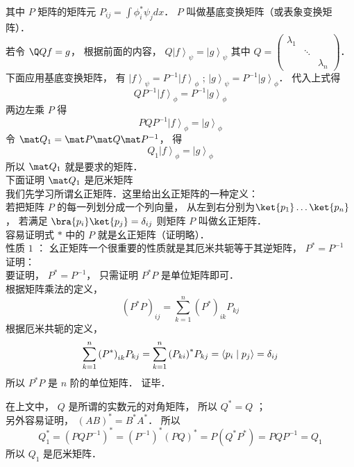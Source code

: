 其中 $P$ 矩阵的矩阵元 ${P_{ij}} = \int {\phi _i^*{\psi _j}dx} $．  $P$ 叫做基底变换矩阵（或表象变换矩阵）．\\
若令 $\Q Q f = g$，  根据前面的内容， $Q{\left| f \right\rangle _\psi } = {\left| g \right\rangle _\psi }$ 其中 $Q = \left( {\begin{aligned}
{{\lambda _1}}&{}&{}\\
{}& \ddots &{}\\
{}&{}&{{\lambda _n}}
\end{aligned}} \right)$． \\
下面应用基底变换矩阵， 有 ${\left| f \right\rangle _\psi } = {P^{ - 1}}{\left| f \right\rangle _\phi }$ ; ${\left| g \right\rangle _\psi } = {P^{ - 1}}{\left| g \right\rangle _\phi }$． 代入上式得
\begin{equation}
  Q{P^{ - 1}}{\left| f \right\rangle _\phi } = {P^{ - 1}}{\left| g \right\rangle _\phi }
\end{equation}
两边左乘 $P$ 得
\begin{equation}
  PQ{P^{ - 1}}{\left| f \right\rangle _\phi } = {\left| g \right\rangle _\phi }
\end{equation}
令 ${\mat Q_1} = \mat P\mat Q{\mat P^{ - 1}}$，  得
\begin{equation}
  {Q_1}{\left| f \right\rangle _\phi } = {\left| g \right\rangle _\phi }
\end{equation}
所以 ${\mat Q_1}$ 就是要求的矩阵．\\
下面证明 ${\mat Q_1}$ 是厄米矩阵\\
我们先学习所谓幺正矩阵．这里给出幺正矩阵的一种定义：\\
若把矩阵 $P$ 的每一列划分成一个列向量， 从左到右分别为$\ket{p_1} \dots\ket{p_n}$，  若满足 $\bra{p_i}\ket{p_j}=\delta_{ij}$ 则矩阵 $P$ 叫做幺正矩阵．\\
容易证明式 $*$ 中的 $P$ 就是幺正矩阵（证明略）．\\
性质 $1$ ： 幺正矩阵一个很重要的性质就是其厄米共轭等于其逆矩阵， ${P^*} = {P^{ - 1}}$ \\
证明：\\
要证明， ${P^*} = {P^{ - 1}}$，  只需证明 ${P^*}P$ 是单位矩阵即可．\\
根据矩阵乘法的定义，
\begin{equation}
{\left( {{P^*}P} \right)_{ij}} = \sum\limits_{k = 1}^n {{{\left( {{P^*}} \right)}_{ik}}{P_{kj}}}
\end{equation}
根据厄米共轭的定义，
\begin{equation}
 \sum\limits_{k = 1}^n {{{\left( {{P^*}} \right)}_{ik}}{P_{kj}}}  = \sum\limits_{k = 1}^n {{{\left( {{P_{ki}}} \right)}^*}{P_{kj}}}  = \left\langle {{{p_i}}}
 \mathrel{\left | {\vphantom {{{p_i}} {{p_j}}}}
 \right. \kern-\nulldelimiterspace}
 {{{p_j}}} \right\rangle  = {\delta _{ij}}
\end{equation}
所以 ${P^*}P$ 是 $n$ 阶的单位矩阵．  证毕．

在上文中， $Q$ 是所谓的实数元的对角矩阵， 所以 ${Q^*} = Q$ ；\\
另外容易证明， ${\left( {AB} \right)^*} = {B^*}{A^*}$．  所以
\begin{equation}
Q_1^* = {\left( {PQ{P^{ - 1}}} \right)^*} = {\left( {{P^{ - 1}}} \right)^*}{\left( {PQ} \right)^*} = P\left( {{Q^*}{P^*}} \right) = PQ{P^{ - 1}} = {Q_1}
\end{equation}
所以 ${Q_1}$ 是厄米矩阵．

